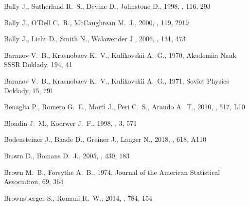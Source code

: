 \documentclass[useAMS, usenatbib, a4paper]{mnras}
\let\ORIGna\na
\let\na\ORIGna
\begin{document}
\begin{thebibliography}{}
{Bally} J.,  {Sutherland} R.~S.,  {Devine} D.,   {Johnstone} D.,  1998, \aj,
  116, 293

{Bally} J.,  {O'Dell} C.~R.,   {McCaughrean} M.~J.,  2000, \aj, 119, 2919

{Bally} J.,  {Licht} D.,  {Smith} N.,   {Walawender} J.,  2006, \aj, 131, 473

{Baranov} V.~B.,  {Krasnobaev} K.~V.,   {Kulikovskii} A.~G.,  1970, Akademiia
  Nauk SSSR Doklady, 194, 41

{Baranov} V.~B.,  {Krasnobaev} K.~V.,   {Kulikovskii} A.~G.,  1971, Soviet
  Physics Doklady, 15, 791

{Benaglia} P.,  {Romero} G.~E.,  {Mart{\'{\i}}} J.,  {Peri} C.~S.,   {Araudo}
  A.~T.,  2010, \aap, 517, L10

{Blondin} J.~M.,  {Koerwer} J.~F.,  1998, \na, 3, 571

{Bodensteiner} J.,  {Baade} D.,  {Greiner} J.,   {Langer} N.,  2018, \aap, 618,
  A110

{Brown} D.,  {Bomans} D.~J.,  2005, \aap, 439, 183

Brown M.~B.,  Forsythe A.~B.,  1974, Journal of the American Statistical
  Association, 69, 364

{Brownsberger} S.,  {Romani} R.~W.,  2014, \apj, 784, 154


\end{thebibliography}
\end{document}
